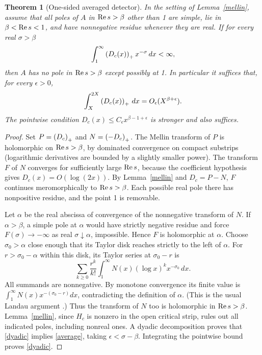 \documentclass[11pt]{article}
\newtheorem{theorem}{Theorem}[section]
\theoremstyle{definition}\newtheorem{definition}[theorem]{Definition}
\begin{document}
\begin{theorem}[One-sided averaged detector]\label{landau}
In the setting of Lemma~\ref{mellin}, assume that all poles of $A$ in $\operatorname{Re} s>\beta$ other than 1 are simple, lie in $\beta<\operatorname{Re} s<1$, and have nonnegative residue whenever they are real. If for every real $\sigma>\beta$
\begin{equation}
 \int_1^\infty \left(D_c(x)\right)_+x^{-\sigma}\,dx<\infty,\label{average}
\end{equation}
then $A$ has no pole in $\operatorname{Re} s>\beta$ except possibly at 1. In particular it suffices that, for every $\epsilon>0$,
\begin{equation}
 \int_X^{2X}\left(D_c(x)\right)_+\,dx=O_\epsilon(X^{\beta+\epsilon}).\label{dyadic}
\end{equation}
The pointwise condition $D_c(x)\le C_\epsilon x^{\beta-1+\epsilon}$ is stronger and also suffices.
\end{theorem}
\begin{proof}
Set $P=\left(D_c\right)_+$ and $N=\left(-D_c\right)_+$. The Mellin transform of $P$ is holomorphic on $\operatorname{Re} s>\beta$, by dominated convergence on compact substrips (logarithmic derivatives are bounded by a slightly smaller power). The transform $F$ of $N$ converges for sufficiently large $\operatorname{Re} s$, because the coefficient hypothesis gives $D_c(x)=O(\log(2x))$. By Lemma~\ref{mellin} and $D_c=P-N$, $F$ continues meromorphically to $\operatorname{Re} s>\beta$. Each possible real pole there has nonpositive residue, and the point 1 is removable.

Let $\alpha$ be the real abscissa of convergence of the nonnegative transform of $N$. If $\alpha>\beta$, a simple pole at $\alpha$ would have strictly negative residue and force $F(\sigma)\to-\infty$ as real $\sigma\downarrow\alpha$, impossible. Hence $F$ is holomorphic at $\alpha$. Choose $\sigma_0>\alpha$ close enough that its Taylor disk reaches strictly to the left of $\alpha$. For $r>\sigma_0-\alpha$ within this disk, its Taylor series at $\sigma_0-r$ is
\[
 \sum_{k\ge0}\frac{r^k}{k!}\int_1^\infty N(x)(\log x)^kx^{-\sigma_0}\,dx.
\]
All summands are nonnegative. By monotone convergence its finite value is $\int_1^\infty N(x)x^{-(\sigma_0-r)}dx$, contradicting the definition of $\alpha$. (This is the usual Landau argument \cite{mv}.) Thus the transform of $N$ too is holomorphic in $\operatorname{Re} s>\beta$. Lemma~\ref{mellin}, since $H_c$ is nonzero in the open critical strip, rules out all indicated poles, including nonreal ones. A dyadic decomposition proves that \eqref{dyadic} implies \eqref{average}, taking $\epsilon<\sigma-\beta$. Integrating the pointwise bound proves \eqref{dyadic}.
\end{proof}
\end{document}
